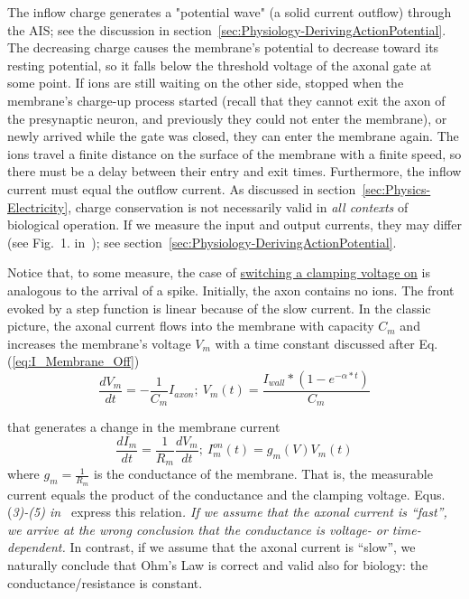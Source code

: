 The inflow charge generates a "potential wave" (a solid current outflow) through the \gls{AIS};
see the discussion in section~\ref{sec:Physiology-DerivingActionPotential}.
The decreasing charge causes the membrane's potential to decrease
toward its resting potential, so it falls below the threshold voltage
of the axonal gate at some point. If ions are still waiting on the
other side, stopped when the membrane's charge-up process started
(recall that they cannot exit the axon of the presynaptic neuron, and previously they could
not enter the membrane), or newly arrived while the gate was closed,
they can enter the membrane again.
The ions travel a finite distance on the surface of the membrane with
a finite speed, so there must be a delay between their entry and exit times. Furthermore,
the inflow current must equal the outflow current. As discussed in
section~\ref{sec:Physics-Electricity}, charge conservation
is not necessarily valid in \emph{all contexts} of biological operation.
If we measure the input and output currents, they may differ (see
Fig.~1. in~\cite{ActionPotentialGenerationNatrium:2008}); see section~\ref{sec:Physiology-DerivingActionPotential}.

Notice that, to some measure, the case of \hyperlink{voltage-clamping}{switching a clamping voltage
on} is analogous to the arrival of a spike. Initially, the axon contains
no ions. The front evoked by a step function is linear because of
the slow current. In the classic picture, the axonal current flows into the membrane with
capacity $C_{m}$ and increases the membrane's voltage $V_{m}$
with a time constant discussed after Eq.(\ref{eq:I_Membrane_Off})
\begin{equation}
	\frac{dV_{m}}{dt}=-\frac{1}{C_{m}}I_{axon};\ V_{m}(t)=\frac{I_{wall}*(1-e^{-\alpha*t})}{C_{m}}\label{eq:MembraneCurrent}
\end{equation}

\noindent that generates a change in the membrane current
\begin{equation}
	\frac{dI_{m}}{dt}=\frac{1}{R_{m}}\frac{dV_{m}}{dt};\ I_{m}^{on}(t)=g_{m}(V)V_{m}(t)\label{eq:TimeDependentConductance}
\end{equation}
\noindent where $g_{m}=\frac{1}{R_{m}}$ is the conductance of the
membrane. That is, the measurable current equals the product of the conductance
and the clamping voltage. Equs.(\emph{3)-(5) in~\cite{HodgkinHuxley:1952}}
express this relation\emph{. If we assume that the axonal current
	is ``fast'', we arrive at the wrong conclusion that the conductance
	is voltage- or time-dependent.}
In contrast, if we assume that the axonal current is ``slow'',
we naturally conclude that Ohm's Law is correct and valid also for
biology: the conductance/resistance is constant.

